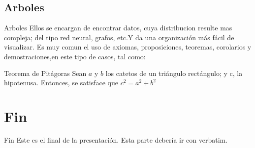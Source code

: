 \documentclass[11pt]{beamer}
\begin{document}
    \subsection{Arboles}	
	    \begin{frame}{Arboles}
			\justifying
			Ellos se encargan de encontrar datos, cuya distribucion resulte mas compleja; del tipo red neural, grafos, etc.Y da una organización más fácil de visualizar.
			Es muy comun el uso de axiomas, proposiciones, teoremas, corolarios y demostraciones,en este tipo de casos, tal como:
            \begin{block}{Teorema de Pitágoras}
                Sean $a$ y $b$ los catetos de un triángulo rectángulo; y c, la hipotenusa. Entonces, se satisface que
                $c^2=a^2+b^2$
            \end{block}
    	\end{frame}
    \section{Fin}
		\begin{frame}[containsverbatim]{Fin}
              Este es el final de la presentación. Esta parte debería ir con verbatim.
        \end{frame}
\end{document}
